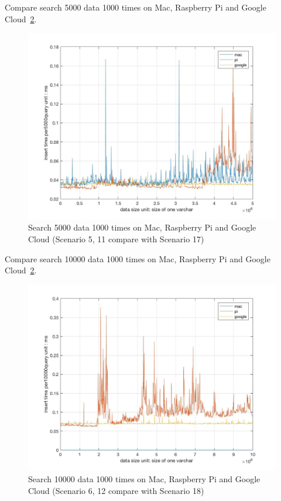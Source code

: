Compare search 5000 data 1000 times on Mac, Raspberry Pi and Google Cloud~\ref{f:fly}.

\begin{figure}[!ht]
  \centering\includegraphics[width=\columnwidth]
  {images/search_comp_5000_three.jpg}
  \caption{Search 5000 data 1000 times on  Mac, Raspberry Pi and Google Cloud
  (Scenario 5, 11 compare with Scenario 17)}\label{f:fly}
\end{figure}


Compare search 10000 data 1000 times on Mac, Raspberry Pi and Google Cloud~\ref{f:fly}.

\begin{figure}[!ht]
  \centering\includegraphics[width=\columnwidth]
  {images/search_comp_10000_three.jpg}
  \caption{Search 10000 data 1000 times on  Mac, Raspberry Pi and Google Cloud
  (Scenario 6, 12 compare with Scenario 18)}\label{f:fly}
\end{figure}



